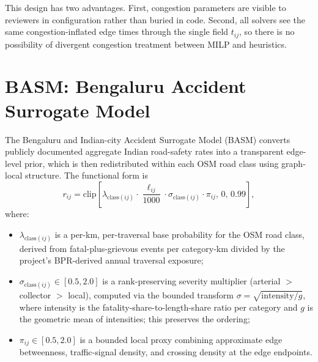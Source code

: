 This design has two advantages. First, congestion parameters are
visible to reviewers in configuration rather than buried in code.
Second, all solvers see the same congestion-inflated edge times
through the single field $t_{ij}$, so there is no possibility of
divergent congestion treatment between MILP and heuristics.

\section{BASM: Bengaluru Accident Surrogate Model}
\label{ch4:basm}

The Bengaluru and Indian-city Accident Surrogate Model (BASM)
converts publicly documented aggregate Indian road-safety rates into
a transparent edge-level prior, which is then redistributed within
each OSM road class using graph-local structure. The functional form
is
\begin{equation}
    r_{ij} = \mathrm{clip}\!\left[
        \lambda_{\mathrm{class}(ij)} \cdot \frac{\ell_{ij}}{1000} \cdot
        \sigma_{\mathrm{class}(ij)} \cdot \pi_{ij},
        \,0,\, 0.99\right],
    \label{eq:BASM}
\end{equation}
where:
\begin{itemize}
    \item $\lambda_{\mathrm{class}(ij)}$ is a per-km, per-traversal
    base probability for the OSM road class, derived from
    \citet{morth2022} fatal-plus-grievous events per category-km
    divided by the project's BPR-derived annual traversal exposure;
    \item $\sigma_{\mathrm{class}(ij)} \in [0.5, 2.0]$ is a
    rank-preserving severity multiplier (arterial $>$ collector $>$
    local), computed via the bounded transform
    $\sigma = \sqrt{\text{intensity} / g}$, where intensity is the
    fatality-share-to-length-share ratio per category and $g$ is the
    geometric mean of intensities; this preserves the
    \citet{mohan2017} ordering;
    \item $\pi_{ij} \in [0.5, 2.0]$ is a bounded local proxy
    combining approximate edge betweenness, traffic-signal density,
    and crossing density at the edge endpoints.
\end{itemize}

